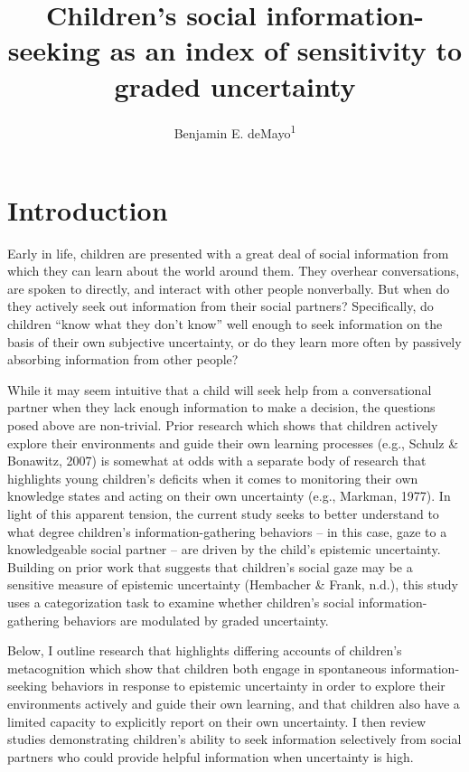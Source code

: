 \documentclass[floatsintext,man]{apa6}
\title{Children's social information-seeking as an index of sensitivity to
graded uncertainty}
\author{Benjamin E. deMayo\textsuperscript{1}}
\affiliation{
    \vspace{0.5cm}
          \textsuperscript{1} Stanford University  }
\theoremstyle{definition}
\theoremstyle{definition}
\theoremstyle{definition}
\theoremstyle{remark}
\begin{document}
\maketitle

\setcounter{secnumdepth}{0}



\section{Introduction}\label{introduction}

Early in life, children are presented with a great deal of social
information from which they can learn about the world around them. They
overhear conversations, are spoken to directly, and interact with other
people nonverbally. But when do they actively seek out information from
their social partners? Specifically, do children \enquote{know what they
don't know} well enough to seek information on the basis of their own
subjective uncertainty, or do they learn more often by passively
absorbing information from other people?

While it may seem intuitive that a child will seek help from a
conversational partner when they lack enough information to make a
decision, the questions posed above are non-trivial. Prior research
which shows that children actively explore their environments and guide
their own learning processes (e.g., Schulz \& Bonawitz, 2007) is
somewhat at odds with a separate body of research that highlights young
children's deficits when it comes to monitoring their own knowledge
states and acting on their own uncertainty (e.g., Markman, 1977). In
light of this apparent tension, the current study seeks to better
understand to what degree children's information-gathering behaviors --
in this case, gaze to a knowledgeable social partner -- are driven by
the child's epistemic uncertainty. Building on prior work that suggests
that children's social gaze may be a sensitive measure of epistemic
uncertainty (Hembacher \& Frank, n.d.), this study uses a categorization
task to examine whether children's social information-gathering
behaviors are modulated by graded uncertainty.

Below, I outline research that highlights differing accounts of
children's metacognition which show that children both engage in
spontaneous information-seeking behaviors in response to epistemic
uncertainty in order to explore their environments actively and guide
their own learning, and that children also have a limited capacity to
explicitly report on their own uncertainty. I then review studies
demonstrating children's ability to seek information selectively from
social partners who could provide helpful information when uncertainty
is high.
\end{document}
